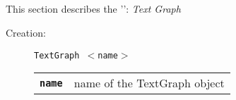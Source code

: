 
\subsection{}

This section describes the '': \textsl{Text Graph}

\begin{description}

  \item[Creation:] \texttt{TextGraph  $<$name$>$}


      \begin{tabular}{ll}
 \texttt{\textbf{name}} &  name of the TextGraph object  \\
      \end{tabular}

\end{description}

